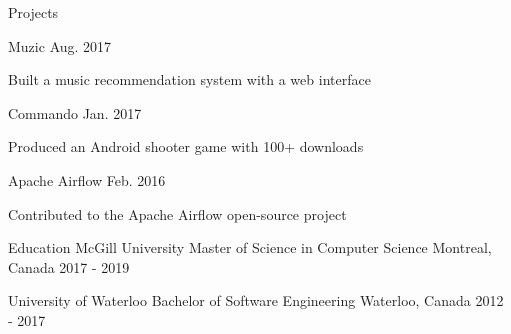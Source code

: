 \documentclass[12pt]{simple-resume}
\begin{document}
%
\begin{rSection}{Projects}%
\begin{entry}
      {Muzic}
      {}
      {Aug. 2017}
      {}%
    \begin{entryItems}
        \item {Built a music recommendation system with a web interface}
    \end{entryItems}
\end{entry}
%
\begin{entry}
      {Commando}
      {}
      {}
      {Jan. 2017}%
    \begin{entryItems}
        \item {Produced an Android shooter game with 100+ downloads}
    \end{entryItems}
\end{entry}
%
\begin{entry}
    {Apache Airflow}
    {} 
    {}
    {Feb. 2016}%
    \begin{entryItems}%
        \item {Contributed to the Apache Airflow open-source project}
    \end{entryItems}
\end{entry}
\end{rSection}
%
\begin{rSection}{Education}%
\education
    {McGill University}
    {Master of Science in Computer Science}
    {Montreal, Canada}
    {2017 - 2019}
    {}

\education
    {University of Waterloo}
    {Bachelor of Software Engineering}
    {Waterloo, Canada}
    {2012 - 2017}
    {}
\end{rSection}
\end{document}
